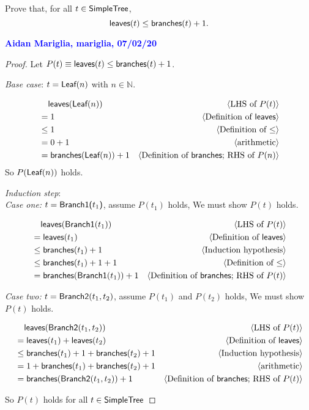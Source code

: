 \documentclass[11pt,fleqn]{article}
\newcommand{\mname}[1]{\mbox{\sf #1}}
\newcommand{\pnote}[1]{{\langle \text{#1} \rangle}}
\begin{document}
  Prove that, for all $t \in \mname{SimpleTree}$, \[\mname{leaves}(t) \le
  \mname{branches}(t) + 1.\]

  \textcolor{blue}{\textbf{Aidan Mariglia, mariglia, 07/02/20}}

  \begin{proof}
  Let $P(t) \equiv \mname{leaves}(t) \leq \mname{branches}(t) + 1$. 

  \medskip

  \emph{Base case}: $t = \mname{Leaf}(n)$ with $n \in \mathbb{N}$.

  \begin{align*}
    &\phantom{{}=}  \mname{leaves}(\mname{Leaf}(n)) & \pnote{LHS of $P(t)$}\\
    &= 1 &\pnote{Definition of $\mname{leaves}$}\\
    &\leq 1 &\pnote{Definition of $\leq$}\\
    &= 0 + 1 & \pnote{arithmetic}\\
    &=\mname{branches}(\mname{Leaf}(n)) + 1 & \pnote{Definition of $\mname{branches}$; RHS of $P(n)$}
  \end{align*}
  So $P(\mname{Leaf}(n))$ holds.

  \medskip

  \emph{Induction step}: \\
  \emph{Case one:} 
  $t = \mname{Branch1($t_1$)}$, assume $P(t_1)$ holds, We must show
  $P(t)$ holds.

  \begin{align*}
    &\phantom{{}=} \mname{leaves}(\mname{Branch1}(t_1)) &\pnote{LHS of $P(t)$}\\
    &= \mname{leaves}(t_1) &\pnote{Definition of $\mname{leaves}$}\\
    &\leq \mname{branches}(t_1) + 1 &\pnote{Induction hypothesis}\\
    &\leq \mname{branches}(t_1) + 1 + 1 &\pnote{Definition of $\leq$}\\
    &= \mname{branches}(\mname{Branch1}(t_1)) + 1 &\pnote{Definition of $\mname{branches}$; RHS of $P(t)$}
  \end{align*}

  \medskip
  \emph{Case two:}
  $t = \mname{Branch2}(t_1, t_2)$, assume $P(t_1)$ and $P(t_2)$ holds,
  We must show $P(t)$ holds.

  \begin{align*}
  &\phantom{{}=} \mname{leaves}(\mname{Branch2}(t_1, t_2)) &\pnote{LHS of $P(t)$}\\
  &= \mname{leaves}(t_1) + \mname{leaves}(t_2) &\pnote{Definition of $\mname{leaves}$}\\
  &\leq \mname{branches}(t_1) + 1 + \mname{branches}(t_2) + 1 &\pnote{Induction hypothesis}\\
  &= 1 + \mname{branches}(t_1) + \mname{branches}(t_2) + 1 &\pnote{arithmetic}\\
  &= \mname{branches}(\mname{Branch2}(t_1, t_2)) + 1 & \pnote{Definition of $\mname{branches}$; RHS of $P(t)$}
  \end{align*}
  
  So $P(t)$ holds for all $t \in \mname{SimpleTree}$
  \end{proof}
\end{document}
